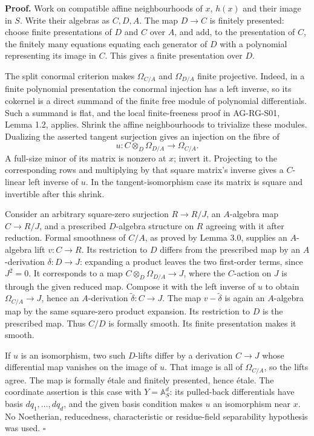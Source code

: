 \documentclass[11pt,a4paper,openany]{report}
\begin{document}
\textbf{Proof.} Work on compatible affine neighbourhoods of \(x\), \(h(x)\) and their image in \(S\). Write their algebras as \(C,D,A\). The map \(D\to C\) is finitely presented: choose finite presentations of \(D\) and \(C\) over \(A\), and add, to the presentation of \(C\), the finitely many equations equating each generator of \(D\) with a polynomial representing its image in \(C\). This gives a finite presentation over \(D\).

The split conormal criterion makes \(\Omega_{C/A}\) and \(\Omega_{D/A}\) finite projective. Indeed, in a finite polynomial presentation the conormal injection has a left inverse, so its cokernel is a direct summand of the finite free module of polynomial differentials. Such a summand is flat, and the local finite-freeness proof in AG-RG-S01, Lemma 1.2, applies. Shrink the affine neighbourhoods to trivialize these modules. Dualizing the asserted tangent surjection gives an injection on the fibre of \[
u:C\otimes_D\Omega_{D/A}\longrightarrow\Omega_{C/A}.
\] A full-size minor of its matrix is nonzero at \(x\); invert it. Projecting to the corresponding rows and multiplying by that square matrix's inverse gives a \(C\)-linear left inverse of \(u\). In the tangent-isomorphism case its matrix is square and invertible after this shrink.

Consider an arbitrary square-zero surjection \(R\to R/J\), an \(A\)-algebra map \(C\to R/J\), and a prescribed \(D\)-algebra structure on \(R\) agreeing with it after reduction. Formal smoothness of \(C/A\), as proved by Lemma 3.0, supplies an \(A\)-algebra lift \(v:C\to R\). Its restriction to \(D\) differs from the prescribed map by an \(A\)-derivation \(\delta:D\to J\): expanding a product leaves the two first-order terms, since \(J^2=0\). It corresponds to a map \(C\otimes_D\Omega_{D/A}\to J\), where the \(C\)-action on \(J\) is through the given reduced map. Compose it with the left inverse of \(u\) to obtain \(\Omega_{C/A}\to J\), hence an \(A\)-derivation \(\widetilde\delta:C\to J\). The map \(v-\widetilde\delta\) is again an \(A\)-algebra map by the same square-zero product expansion. Its restriction to \(D\) is the prescribed map. Thus \(C/D\) is formally smooth. Its finite presentation makes it smooth.

If \(u\) is an isomorphism, two such \(D\)-lifts differ by a derivation \(C\to J\) whose differential map vanishes on the image of \(u\). That image is all of \(\Omega_{C/A}\), so the lifts agree. The map is formally étale and finitely presented, hence étale. The coordinate assertion is this case with \(Y=\mathbb A^d_S\): its pulled-back differentials have basis \(dq_1,\ldots,dq_d\), and the given basis condition makes \(u\) an isomorphism near \(x\). No Noetherian, reducedness, characteristic or residue-field separability hypothesis was used. \(\square\)
\end{document}
